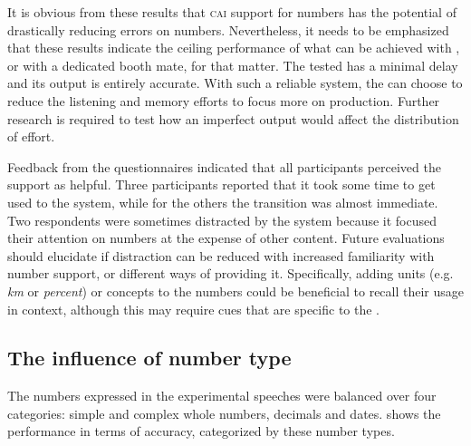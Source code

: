 \documentclass[output=paper]{langsci/langscibook}
\begin{document}
It is obvious from these results that \textsc{cai} support for numbers has the potential of drastically reducing errors on numbers. Nevertheless, it needs to be emphasized that these results indicate the ceiling performance of what can be achieved with , or with a dedicated booth mate, for that matter. The tested  has a minimal delay and its output is entirely accurate. With such a reliable system, the  can choose to reduce the listening and memory efforts to focus more on production. Further research is required to test how an imperfect output would affect the distribution of effort.

Feedback from the questionnaires indicated that all participants perceived the support as helpful. Three participants reported that it took some time to get used to the system, while for the others the transition was almost immediate. Two respondents were sometimes distracted by the system because it focused their attention on numbers at the expense of other content. Future evaluations should elucidate if distraction can be reduced with increased familiarity with number support, or different ways of providing it. Specifically, adding units (e.g. \textit{km} or \textit{percent}) or concepts to the numbers could be beneficial to recall their usage in context, although this may require cues that are specific to the .

\subsection{The influence of number type}\largerpage
The numbers expressed in the experimental speeches were balanced over four categories: simple and complex whole numbers, decimals and dates.  shows the performance in terms of accuracy, categorized by these number types.
\end{document}
